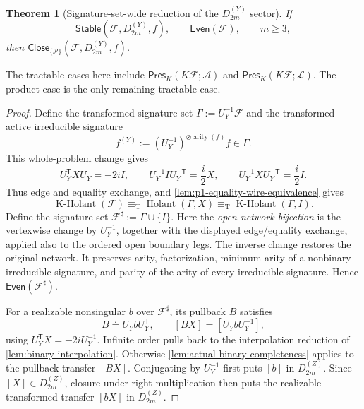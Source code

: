 \documentclass[11pt,letterpaper,onecolumn]{article}
\theoremstyle{plain}
\newtheorem{theorem}{Theorem}[section]
\theoremstyle{definition}
\theoremstyle{remark}
\newcommand{\cF}{\mathcal F}
\newcommand{\cA}{\mathscr A}
\newcommand{\cP}{\mathscr P}
\newcommand{\cL}{\mathscr L}
\newcommand{\Holant}{\operatorname{Holant}}
\newcommand{\KHolant}{\operatorname{K\text{-}Holant}}
\newcommand{\DihZ}[1]{{D_{#1}^{(Z)}}}
\newcommand{\DihY}[1]{{D_{#1}^{(Y)}}}
\newcommand{\PresK}{\mathsf{Pres}_{K}}
\newcommand{\Stable}{\mathsf{Stable}}
\newcommand{\Even}{\mathsf{Even}}
\newcommand{\Close}{\mathsf{Close}}
\newcommand{\arity}{\operatorname{arity}}
\newcommand{\equivT}{\equiv_{\mathrm T}}
\begin{document}
\begin{theorem}[Signature-set-wide reduction of the \(\DihY{2m}\) sector]
\label{thm:marked-B-reduction}
If
\[
 \Stable(\cF,\DihY{2m},f),\qquad
 \Even(\cF),\qquad m\ge3,
\]
then \(\Close_{\{\cP\}}(\cF,\DihY{2m},f)\).
\end{theorem}

The tractable cases here include
\(\PresK(K\cF;\cA)\) and \(\PresK(K\cF;\cL)\). The product case is
the only remaining tractable case.

\begin{proof}
Define the transformed signature set
\(\Gamma:=U_{Y}^{-1}\cF\) and the transformed active irreducible signature
\[
 f^{(Y)}:=(U_{Y}^{-1})^{\otimes\arity(f)}f\in\Gamma.
\]
This whole-problem change gives
\begin{equation*}
 U_{Y}^{\mathsf T}XU_{Y}=-2iI,
 \qquad
 U_{Y}^{-1}IU_{Y}^{-\mathsf T}=\frac{i}{2}X,
 \qquad
 U_{Y}^{-1}XU_{Y}^{-\mathsf T}=\frac{i}{2}I.
\end{equation*}
Thus edge and equality exchange, and \cref{lem:p1-equality-wire-equivalence}
gives
\begin{equation*}
 \KHolant(\cF)
 \equivT
 \Holant(\Gamma,X)
 \equivT
 \KHolant(\Gamma,I).
\end{equation*}
Define the signature set
\(\cF^\sharp:=\Gamma\cup\{I\}\).  Here the \emph{open-network
bijection} is the vertexwise change by \(U_{Y}^{-1}\), together
with the displayed edge/equality exchange, applied also to the ordered open
boundary legs. The inverse change restores the original network.  It
preserves arity, factorization, minimum arity of a nonbinary irreducible signature, and parity of
the arity of every irreducible signature. Hence \(\Even(\cF^\sharp)\).

For a realizable nonsingular \(b\) over \(\cF^\sharp\), its pullback
\(B\) satisfies
\begin{equation*}
 B\doteq U_{Y}bU_{Y}^{\mathsf T},
 \qquad
 [BX]=[U_{Y}bU_{Y}^{-1}],
\end{equation*}
using \(U_{Y}^{\mathsf T}X=-2iU_{Y}^{-1}\).  Infinite
order pulls back to the interpolation reduction of
\cref{lem:binary-interpolation}. Otherwise
\cref{lem:actual-binary-completeness} applies to the pullback transfer
\([BX]\).  Conjugating by \(U_{Y}^{-1}\) first puts
\([b]\) in \(\DihZ{2m}\).  Since \([X]\in\DihZ{2m}\), closure under
right multiplication then puts the realizable transformed transfer
\([bX]\) in \(\DihZ{2m}\).


\end{proof}
\end{document}
